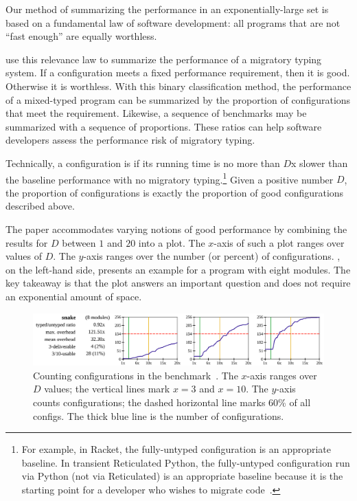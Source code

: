 Our method of summarizing the performance in an exponentially-large set
 is based on a fundamental law of software development:
 all programs that are not ``fast enough'' are equally worthless.

\citet{tfgnvf-popl-2016} use this relevance law to summarize the performance
 of a migratory typing system.
If a configuration meets a fixed performance requirement, then it is good.
Otherwise it is worthless.
With this binary classification method, the performance of a mixed-typed program
 can be summarized by the proportion of configurations that meet the requirement.
Likewise, a sequence of benchmarks may be summarized with a sequence of
 proportions.
These ratios can help software developers assess the performance risk of
 migratory typing.

Technically, a configuration is 
 if its running time is no more than $D$x slower than the baseline performance
 with no migratory typing.\footnote{For example, in Racket, the fully-untyped configuration
 is an appropriate baseline. In transient Reticulated Python, the fully-untyped configuration
 run via Python (not via Reticulated) is an appropriate baseline because it is the starting
 point for a developer who wishes to migrate code~\cite{gm-pepm-2018}.}
Given a positive number $D$, the proportion of  configurations
 is exactly the proportion of good configurations described above.

The paper accommodates varying notions of good performance by combining the
 results for $D$ between $1$ and $20$ into a plot.
The $x$-axis of such a plot ranges over values of $D$.
The $y$-axis ranges over the number (or percent) of configurations.
, on the left-hand side, presents an example
 for a program with eight modules.
The key takeaway is that the plot answers an important question and does
 not require an exponential amount of space.

\begin{figure}[h]
\includegraphics[width=0.96\columnwidth]{src/snake-popl.png}
\caption{Counting  configurations in the 
         benchmark~\cite{tfgnvf-popl-2016}. The $x$-axis ranges over $D$ values;
         the vertical lines mark $x=3$ and $x=10$.
         The $y$-axis counts configurations; the dashed horizontal line marks
         $60$\% of all configs.
         The thick blue line is the number of  configurations.}
\label{fig:snake-popl}
\end{figure}

